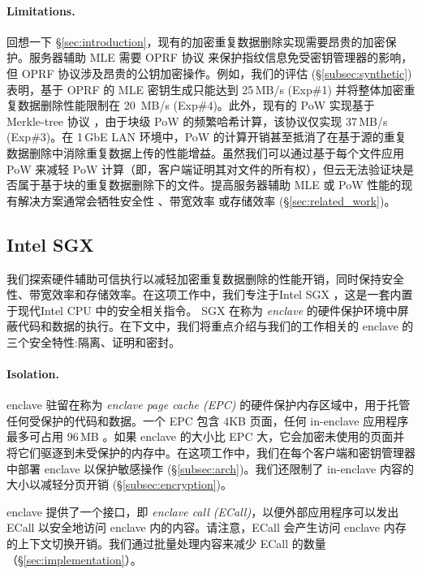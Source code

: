 \paragraph{Limitations.} 回想一下 \S\ref{sec:introduction}，现有的加密重复数据删除实现需要昂贵的加密保护。服务器辅助 MLE 需要 OPRF 协议 \cite{naor04} 来保护指纹信息免受密钥管理器的影响，但 OPRF 协议涉及昂贵的公钥加密操作。例如，我们的评估 (\S\ref{subsec:synthetic}) 表明，基于 OPRF 的 MLE 密钥生成只能达到 25\,MB/s (Exp\#1) 并将整体加密重复数据删除性能限制在 20 \,MB/s (Exp\#4)。此外，现有的 PoW 实现基于 Merkle-tree 协议 \cite{halevi11}，由于块级 PoW 的频繁哈希计算，该协议仅实现 37\,MB/s (Exp\#3)。在 1\,GbE LAN 环境中，PoW 的计算开销甚至抵消了在基于源的重复数据删除中消除重复数据上传的性能增益。虽然我们可以通过基于每个文件应用 PoW 来减轻 PoW 计算（即，客户端证明其对文件的所有权），但云无法验证块是否属于基于块的重复数据删除下的文件。提高服务器辅助 MLE 或 PoW 性能的现有解决方案通常会牺牲安全性 \cite{li20b,xu13,pietro12}、带宽效率 \cite{harnik10,li15} 或存储效率 \cite{zhou15,qin17,li20b} (\S\ref{sec:related_work})。

\subsection{Intel SGX}
\label{subsec:sgx} 

我们探索硬件辅助可信执行以减轻加密重复数据删除的性能开销，同时保持安全性、带宽效率和存储效率。在这项工作中，我们专注于Intel SGX \cite{sgx}，这是一套内置于现代Intel CPU 中的安全相关指令。 SGX 在称为 \textit{ enclave} 的硬件保护环境中屏蔽代码和数据的执行。在下文中，我们将重点介绍与我们的工作相关的 enclave 的三个安全特性:隔离、证明和密封。

\paragraph{Isolation.} enclave 驻留在称为 \textit{ enclave page cache (EPC)} 的硬件保护内存区域中，用于托管任何受保护的代码和数据。一个 EPC 包含 4KB 页面，任何 in-enclave 应用程序最多可占用 96\,MB \cite{harnik18}。如果 enclave 的大小比 EPC 大，它会加密未使用的页面并将它们驱逐到未受保护的内存中。在这项工作中，我们在每个客户端和密钥管理器中部署 enclave 以保护敏感操作 (\S\ref{subsec:arch})。我们还限制了 in-enclave 内容的大小以减轻分页开销 (\S\ref{subsec:encryption})。

enclave 提供了一个接口，即 \textit{ enclave call (ECall)}，以便外部应用程序可以发出 ECall 以安全地访问 enclave 内的内容。请注意，ECall 会产生访问 enclave 内存 \cite{harnik18} 的上下文切换开销。我们通过批量处理内容来减少 ECall 的数量（\S\ref{sec:implementation}）。

